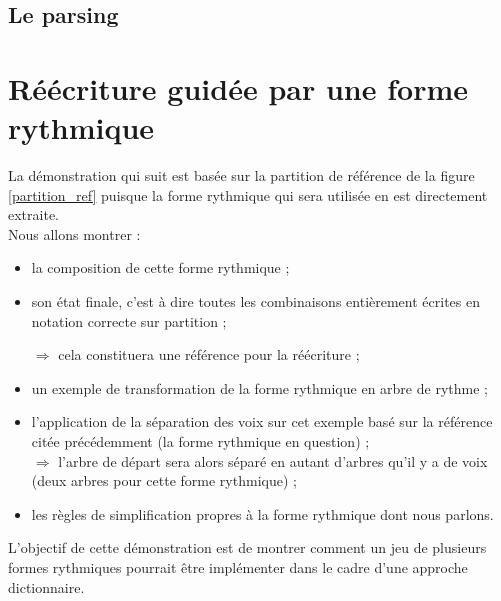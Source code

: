 \subsection*{Le parsing}
\label{gram_pond}

\newpage


\section{Réécriture guidée par une forme rythmique}
\label{reecriture_guidee}
La démonstration qui suit est basée sur la partition de référence de la figure
\ref{partition_ref} puisque la forme rythmique qui sera utilisée en est
directement extraite.\\

Nous allons montrer :
\begin{itemize}
    \item la composition de cette forme rythmique ;
    \item son état finale, c’est à dire toutes les combinaisons entièrement
        écrites en notation correcte sur partition ;

        $\Rightarrow$ cela constituera une référence pour la réécriture ;
    \item un exemple de transformation de la forme rythmique en arbre de
        rythme ;
    \item l’application de la séparation des voix sur cet exemple basé sur la
        référence citée précédemment (la forme rythmique en question) ;\\
        $\Rightarrow$ l’arbre de départ sera alors séparé en autant d’arbres
        qu’il y a de voix (deux arbres pour cette forme rythmique) ;
    \item les règles de simplification propres à la forme rythmique dont nous
        parlons. 
\end{itemize}
L’objectif de cette démonstration est de montrer comment un jeu de plusieurs
formes rythmiques pourrait être implémenter dans le cadre d’une approche
dictionnaire.

